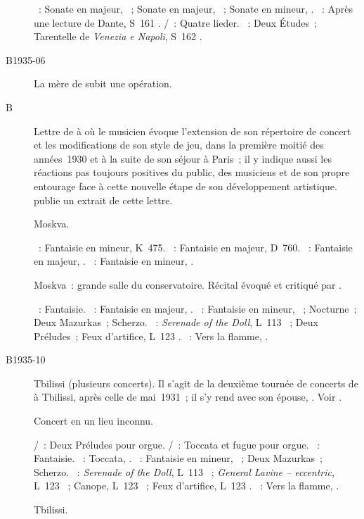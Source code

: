 \begin{description}
 \textsc{\Beethoven{}}~: Sonate en \kD majeur, ~; Sonate en \kF
 \Sharp majeur, ~; Sonate en \kC \Sharp mineur, 
 .
 \textsc{\Liszt{}}~: Après une lecture de Dante, S~161 .
 \textsc{\Schubert{}/\Liszt{}}~: Quatre lieder.
 \textsc{\Liszt{}}~: Deux Études~; Tarentelle de \emph{Venezia e Napoli},
 S~162 .
 \item[B1935-06]
 La mère de \VSofronitsky{} subit une opération.
 \item[B\DateWithWeekDay{1935-07-07}]
 Lettre de \VSofronitsky{} à \AVizel{} où le musicien évoque l'extension de
 son répertoire de concert et les modifications de son style de jeu, dans la
 première moitié des années~1930 et à la suite de son séjour à Paris~; il y
 indique aussi les réactions pas toujours positives du public, des musiciens
 et de son propre entourage face à cette nouvelle étape de son développement
 artistique.
 \citet[p.~156]{Nekrasova08} publie un extrait de cette lettre.
 \item[\DateWithWeekDay{1935-09-17}]
 Moskva.

 \textsc{\Mozart{}}~: Fantaisie en \kC mineur, K~475.
 \textsc{\Schubert{}}~: Fantaisie  en \kC majeur, D~760.
 \textsc{\Schumann{}}~: Fantaisie en \kC majeur, .
 \textsc{\Chopin{}}~: Fantaisie en \kF mineur, .
 \item[\DateWithWeekDay{1935-09-18}]
 Moskva~: grande salle du conservatoire.
 Récital évoqué et critiqué par \citet{Drozdov35}.

 \textsc{\Mozart{}}~: Fantaisie.
 \textsc{\Schumann{}}~: Fantaisie en \kC majeur, .
 \textsc{\Chopin{}}~: Fantaisie en \kF mineur, ~; Nocturne~; Deux
 Mazurkas~; Scherzo.
 \textsc{\Debussy{}}~: \emph{Serenade of the Doll}, L~113 ~;
 Deux Préludes~; Feux d'artifice, L~123 .
 \textsc{\Scriabine{}}~: Vers la flamme, .
 \item[B1935-10]
 Tbilissi (plusieurs concerts).
 Il s'agit de la deuxième tournée de concerts de \VSofronitsky{} à Tbilissi,
 après celle de mai~1931~; il s'y rend avec son épouse, \ESofronitskaya{}.
 Voir \citet[p.~157]{Nekrasova08}.
 \item[\DateWithWeekDay{1935-10-19}]
 Concert en un lieu inconnu.

 \textsc{\JBach{}/\Ziloti{}}~: Deux Préludes pour orgue.
 \textsc{\JBach{}/\Busoni{}}~: Toccata et fugue pour orgue.
 \textsc{\Mozart{}}~: Fantaisie.
 \textsc{\Schumann{}}~: Toccata, .
 \textsc{\Chopin{}}~: Fantaisie en \kF mineur, ~; Deux Mazurkas~;
 Scherzo.
 \textsc{\Debussy{}}~: \emph{Serenade of the Doll}, L~113 ~;
 \emph{General Lavine -- eccentric}, L~123 ~; Canope, L~123
 ~; Feux d'artifice, L~123 .
 \textsc{\Scriabine{}}~: Vers la flamme, .
 \item[\DateWithWeekDay{1935-10-27}]
 Tbilissi.


\end{description}

